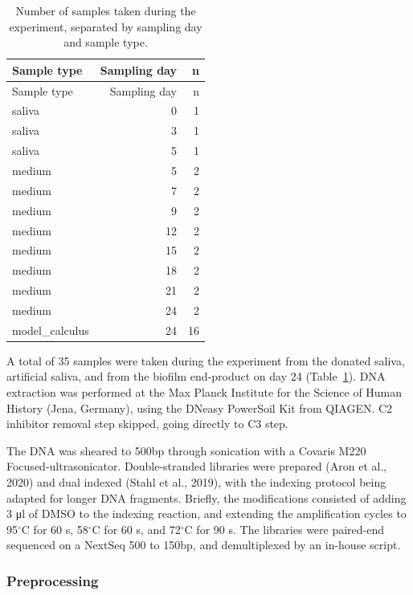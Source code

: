 \documentclass[
]{article}
\begin{document}
\hypertarget{tbl-dna-samples}{}
\begin{longtable}[]{@{}lrr@{}}
\caption{\label{tbl-dna-samples}Number of samples taken during the
experiment, separated by sampling day and sample type.}\tabularnewline
\toprule()
Sample type & Sampling day & n \\
\midrule()
\endfirsthead
\toprule()
Sample type & Sampling day & n \\
\midrule()
\endhead
saliva & 0 & 1 \\
saliva & 3 & 1 \\
saliva & 5 & 1 \\
medium & 5 & 2 \\
medium & 7 & 2 \\
medium & 9 & 2 \\
medium & 12 & 2 \\
medium & 15 & 2 \\
medium & 18 & 2 \\
medium & 21 & 2 \\
medium & 24 & 2 \\
model\_calculus & 24 & 16 \\
\bottomrule()
\end{longtable}

A total of 35 samples were taken during the experiment from the donated
saliva, artificial saliva, and from the biofilm end-product on day 24
(Table~\ref{tbl-dna-samples}). DNA extraction was performed at the Max
Planck Institute for the Science of Human History (Jena, Germany), using
the DNeasy PowerSoil Kit from QIAGEN. C2 inhibitor removal step skipped,
going directly to C3 step.

The DNA was sheared to 500bp through sonication with a Covaris M220
Focused-ultrasonicator. Double-stranded libraries were prepared (Aron et
al., 2020) and dual indexed (Stahl et al., 2019), with the indexing
protocol being adapted for longer DNA fragments. Briefly, the
modifications consisted of adding 3 μl of DMSO to the indexing reaction,
and extending the amplification cycles to 95\(^{\circ}\)C for 60 s,
58\(^{\circ}\)C for 60 s, and 72\(^{\circ}\)C for 90 s. The libraries
were paired-end sequenced on a NextSeq 500 to 150bp, and demultiplexed
by an in-house script.

\hypertarget{preprocessing}{%
\subsubsection{Preprocessing}\label{preprocessing}}
\end{document}
